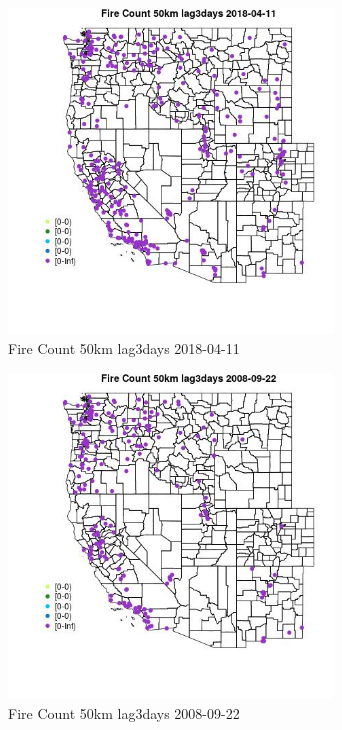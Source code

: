 \begin{figure} 
\centering  
\includegraphics[width=0.77\textwidth]{Code_Outputs/Report_ML_input_PM25_Step4_part_e_de_duplicated_aves_compiled_2019-05-18wNAs_MapObsFire_Count_50km_lag3days2018-04-11.jpg} 
\caption{\label{fig:Report_ML_input_PM25_Step4_part_e_de_duplicated_aves_compiled_2019-05-18wNAsMapObsFire_Count_50km_lag3days2018-04-11}Fire Count 50km lag3days 2018-04-11} 
\end{figure} 
 

\clearpage 

\begin{figure} 
\centering  
\includegraphics[width=0.77\textwidth]{Code_Outputs/Report_ML_input_PM25_Step4_part_e_de_duplicated_aves_compiled_2019-05-18wNAs_MapObsFire_Count_50km_lag3days2008-09-22.jpg} 
\caption{\label{fig:Report_ML_input_PM25_Step4_part_e_de_duplicated_aves_compiled_2019-05-18wNAsMapObsFire_Count_50km_lag3days2008-09-22}Fire Count 50km lag3days 2008-09-22} 
\end{figure} 
 

